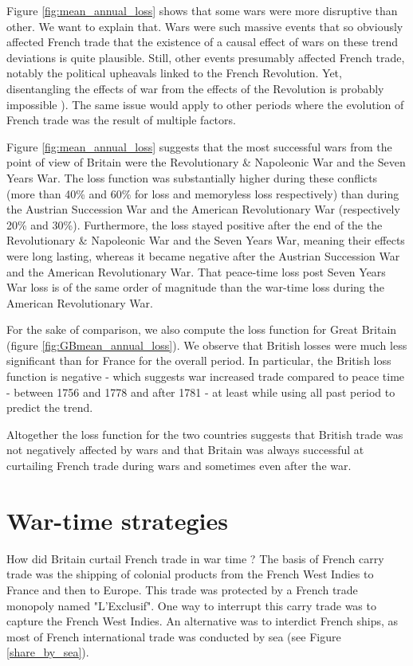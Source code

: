 \documentclass[12pt,a4paper,notitlepage,english]{article}
\begin{document}
Figure \ref{fig:mean_annual_loss} shows that some wars were more disruptive than other. 
We want to explain that.
Wars were such massive events that so obviously affected French trade that the existence of a causal effect of wars on these trend deviations is quite plausible.
Still, other events presumably affected French trade, notably the political upheavals linked to the French Revolution. 
Yet, disentangling the effects of war from the effects of the Revolution is probably impossible \citep{Charles2021}).
The same issue would apply to other periods where the evolution of French trade was the result of multiple factors.

Figure \ref{fig:mean_annual_loss} suggests that the most successful wars from the point of view of Britain were the Revolutionary \& Napoleonic War and the Seven Years War.
The loss function was substantially higher during these conflicts (more than 40\% and 60\% for loss and memoryless loss respectively) than during the Austrian Succession War and the American Revolutionary War (respectively 20\% and 30\%).
Furthermore, the loss stayed positive after the end of the the Revolutionary \& Napoleonic War and the Seven Years War, meaning their effects were long lasting, whereas it became negative after the Austrian Succession War and the American Revolutionary War.
That peace-time loss post Seven Years War loss is of the same order of magnitude than the war-time loss during the American Revolutionary War.

For the sake of comparison, we also compute the loss function for Great Britain (figure \ref{fig:GBmean_annual_loss}).
We observe that British losses were much less significant than for France for the overall period.
In particular, the British loss function is negative - which suggests war increased trade compared to peace time - between 1756 and 1778 and after 1781 - at least while using all past period to predict the trend.

Altogether the loss function for the two countries suggests that British trade was not negatively affected by wars and that Britain was always successful at curtailing French trade during wars and sometimes even after the war.  

\section{War-time strategies}
\label{sec:wartime_strategies}

How did Britain curtail French trade in war time ?
The basis of French carry trade was the shipping of colonial products from the French West Indies to France and then to Europe.
This trade was protected by a French trade monopoly named "L’Exclusif".
One way to interrupt this carry trade was to capture the French West Indies.
An alternative was to interdict French ships, as most of French international trade was conducted by sea (see Figure \ref{share_by_sea}).
\end{document}
